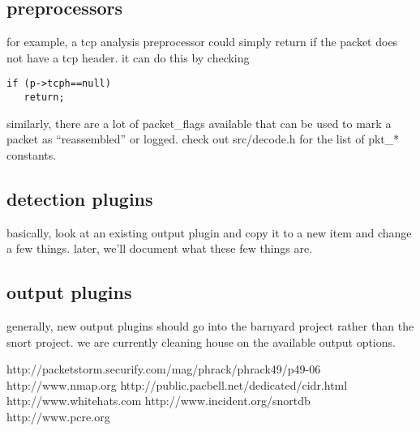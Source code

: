 \documentclass[english]{report}
\begin{document}
\subsection{preprocessors}

for example, a tcp analysis preprocessor could simply return if the
packet does not have a tcp header. it can do this by checking 

\begin{verbatim}
if (p->tcph==null)
   return;
\end{verbatim}
similarly, there are a lot of packet\_flags available that can be
used to mark a packet as ``reassembled'' or logged. check out src/decode.h
for the list of pkt\_{*} constants.


\subsection{detection plugins}
basically, look at an existing output plugin and copy it to a new item
and change a few things. later, we'll document what these few things are.

\subsection{output plugins}
generally, new output plugins should go into the barnyard project
rather than the snort project. we are currently cleaning house on the
available output options.

\appendix

\begin{thebibliography}{99}
http://packetstorm.securify.com/mag/phrack/phrack49/p49-06
http://www.nmap.org
http://public.pacbell.net/dedicated/cidr.html
http://www.whitehats.com
http://www.incident.org/snortdb
http://www.pcre.org
\end{thebibliography}
\end{document}
